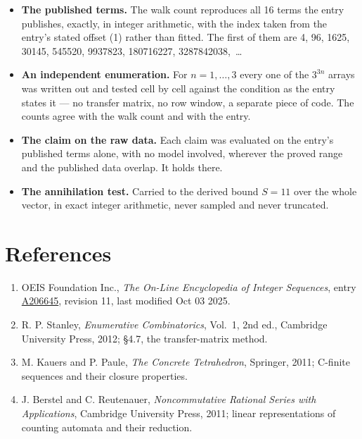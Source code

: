 \documentclass[11pt]{article}
\theoremstyle{definition}
\begin{document}
\begin{itemize}

\item {\bfseries The published terms.} The walk count reproduces all 16 terms the entry publishes, exactly, in integer arithmetic, with the index taken from the entry's stated offset (1) rather than fitted. The first of them are 4, 96, 1625, 30145, 545520, 9937823, 180716227, 3287842038,~\dots

\item {\bfseries An independent enumeration.} For $n = 1,\dots,3$ every one of the $3^{3n}$ arrays was written out and tested cell by cell against the condition as the entry states it --- no transfer matrix, no row window, a separate piece of code. The counts agree with the walk count and with the entry.

\item {\bfseries The claim on the raw data.} Each claim was evaluated on the entry's published terms alone, with no model involved, wherever the proved range and the published data overlap. It holds there.

\item {\bfseries The annihilation test.} Carried to the derived bound $S = 11$ over the whole vector, in exact integer arithmetic, never sampled and never truncated.

\end{itemize}

\section{References}

\begin{enumerate}

\item OEIS Foundation Inc., \emph{The On-Line Encyclopedia of Integer Sequences}, entry \href{https://oeis.org/A206645}{A206645}, revision 11, last modified Oct 03 2025.

\item R. P. Stanley, \emph{Enumerative Combinatorics}, Vol.~1, 2nd ed., Cambridge University Press, 2012; \S4.7, the transfer-matrix method.

\item M. Kauers and P. Paule, \emph{The Concrete Tetrahedron}, Springer, 2011; C-finite sequences and their closure properties.

\item J. Berstel and C. Reutenauer, \emph{Noncommutative Rational Series with Applications}, Cambridge University Press, 2011; linear representations of counting automata and their reduction.

\end{enumerate}
\end{document}
